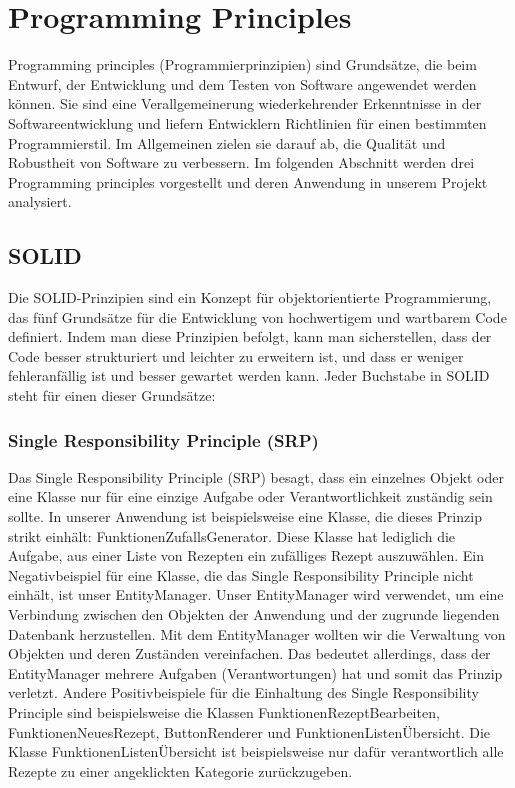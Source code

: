 \chapter{Programming Principles}
Programming principles (Programmierprinzipien) sind Grundsätze, die beim Entwurf, der Entwicklung und dem Testen von Software angewendet werden können. Sie sind eine Verallgemeinerung wiederkehrender Erkenntnisse in der Softwareentwicklung und liefern Entwicklern Richtlinien für einen bestimmten Programmierstil.
Im Allgemeinen zielen sie darauf ab, die Qualität und Robustheit von Software zu verbessern. Im folgenden Abschnitt werden drei Programming principles vorgestellt und deren Anwendung in unserem Projekt analysiert. 
\section{SOLID}
Die SOLID-Prinzipien sind ein Konzept für objektorientierte Programmierung, das fünf Grundsätze für die Entwicklung von hochwertigem und wartbarem Code definiert. Indem man diese Prinzipien befolgt, kann man sicherstellen, dass der Code besser strukturiert und leichter zu erweitern ist, und dass er weniger fehleranfällig ist und besser gewartet werden kann. Jeder Buchstabe in SOLID steht für einen dieser Grundsätze:
\subsection{Single Responsibility Principle (SRP)}
Das Single Responsibility Principle (SRP) besagt, dass ein einzelnes Objekt oder eine Klasse nur für eine einzige Aufgabe oder Verantwortlichkeit zuständig sein  sollte.
In unserer Anwendung ist beispielsweise eine Klasse, die dieses Prinzip strikt einhält: FunktionenZufallsGenerator. Diese Klasse hat lediglich die Aufgabe, aus einer Liste von Rezepten ein \glqq zufälliges\grqq{} Rezept auszuwählen. 
Ein Negativbeispiel für eine Klasse, die das Single Responsibility Principle nicht einhält, ist unser EntityManager. Unser EntityManager wird verwendet, um eine Verbindung zwischen den Objekten der Anwendung und der zugrunde liegenden Datenbank herzustellen. Mit dem EntityManager wollten wir die Verwaltung von Objekten und deren Zuständen vereinfachen. Das bedeutet allerdings, dass der EntityManager mehrere Aufgaben (Verantwortungen) hat und somit das Prinzip verletzt. 
Andere Positivbeispiele für die Einhaltung des Single Responsibility Principle sind beispielsweise die Klassen FunktionenRezeptBearbeiten, FunktionenNeuesRezept, ButtonRenderer und FunktionenListenÜbersicht. Die Klasse FunktionenListenÜbersicht ist beispielsweise nur dafür verantwortlich alle Rezepte zu einer angeklickten Kategorie zurückzugeben. 
